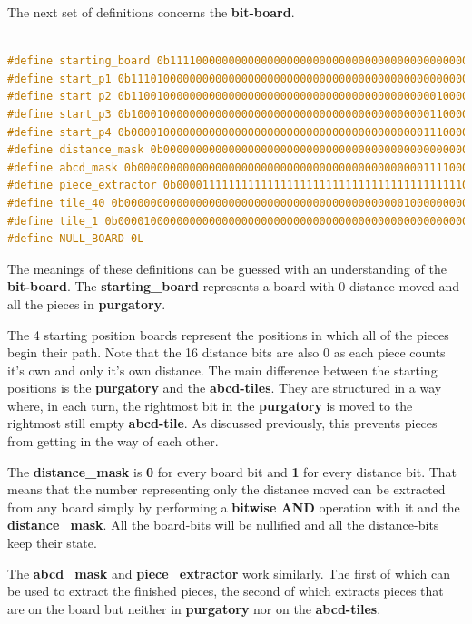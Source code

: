 \documentclass[12pt]{article}
\begin{document}
The next set of definitions concerns the \textbf{bit-board}.

\begin{lstlisting}[language=C, caption={Bit-board definitions}, label={lst:bit-board-defs}]

#define starting_board 0b1111000000000000000000000000000000000000000000000000000000000000
#define start_p1 0b1110100000000000000000000000000000000000000000000000000000000000
#define start_p2 0b1100100000000000000000000000000000000000000000010000000000000000
#define start_p3 0b1000100000000000000000000000000000000000000000110000000000000000
#define start_p4 0b0000100000000000000000000000000000000000000001110000000000000000
#define distance_mask 0b0000000000000000000000000000000000000000000000001111111111111111
#define abcd_mask 0b0000000000000000000000000000000000000000000011110000000000000000
#define piece_extractor 0b0000111111111111111111111111111111111111111100000000000000000000
#define tile_40 0b0000000000000000000000000000000000000000000100000000000000000000
#define tile_1 0b0000100000000000000000000000000000000000000000000000000000000000
#define NULL_BOARD 0L

\end{lstlisting}

The meanings of these definitions can be guessed with an understanding of the \textbf{bit-board}. The \textbf{starting\_board} represents a board with 0 distance moved and all the pieces in \textbf{purgatory}.

The 4 starting position boards represent the positions in which all of the pieces begin their path. Note that the 16 distance bits are also 0 as each piece counts it's own and only it's own distance.
The main difference between the starting positions is the \textbf{purgatory} and the \textbf{abcd-tiles}. They are structured in a way where, in each turn, the rightmost bit in the \textbf{purgatory} is moved to the rightmost still empty \textbf{abcd-tile}. As discussed previously, this prevents pieces from getting in the way of each other.

The \textbf{distance\_mask} is \textbf{0} for every board bit and \textbf{1} for every distance bit. That means that the number representing only the distance moved can be extracted from any board simply by performing a \textbf{bitwise AND} operation with it and the \textbf{distance\_mask}. All the board-bits will be nullified and all the distance-bits keep their state.

The \textbf{abcd\_mask} and \textbf{piece\_extractor} work similarly. The first of which can be used to extract the finished pieces, the second of which extracts pieces that are on the board but neither in \textbf{purgatory} nor on the \textbf{abcd-tiles}.
\end{document}
